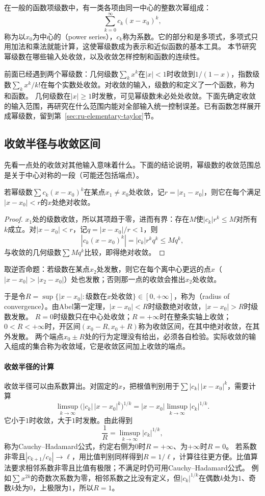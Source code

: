 在一般的函数项级数中，有一类各项由同一中心的整数次幂组成：
\[
 \sum_{k=0}^\infty c_k(x-x_0)^k,
\]
称为以$x_0$为中心的（power series），$c_k$称为系数。它的部分和是多项式，多项式只用加法和乘法就能计算，这使幂级数成为表示和近似函数的基本工具。
本节研究幂级数在哪些输入处收敛，以及收敛怎样控制和函数的连续性。

前面已经遇到两个幂级数：几何级数$\sum_kx^k$在$|x|<1$时收敛到$1/(1-x)$，指数级数$\sum_kx^k/k!$在每个实数处收敛。对收敛的输入，级数的和定义了一个函数，称为和函数。
几何级数在$|x|\geq1$时发散，可见幂级数未必处处收敛。下面先确定收敛的输入范围，再研究在什么范围内能对全部输入统一控制误差。已有函数怎样展开成幂级数，留到第~\ref{sec:ru-elementary-taylor}节。

\subsection{收敛半径与收敛区间}
\label{sec:ru-radius-of-convergence}

先看一点处的收敛对其他输入意味着什么。下面的结论说明，幂级数的收敛范围总是关于中心对称的一段（可能还包括端点）。
\begin{theorem}[Abel第一定理]
\label{thm:ru-abel-lemma}
若幂级数$\sum c_k(x-x_0)^k$在某点$x_1\neq x_0$处收敛，记$r=|x_1-x_0|$，则它在每个满足$|x-x_0|<r$的$x$处绝对收敛。
\end{theorem}
\begin{proof}
$x_1$处的级数收敛，所以其项趋于零，进而有界：存在$M$使$|c_k|r^k\leq M$对所有$k$成立。对$|x-x_0|<r$，记$q=|x-x_0|/r<1$，则
\[
 |c_k(x-x_0)^k|=|c_k|r^kq^k\leq Mq^k,
\]
与收敛的几何级数$\sum Mq^k$比较，即得绝对收敛。
\end{proof}
取逆否命题：若级数在某点$x_2$处发散，则它在每个离中心更远的点$x$（$|x-x_0|>|x_2-x_0|$）处也发散；否则那一点的收敛会推出$x_2$处收敛。

于是令$R=\sup\{|x-x_0|:\text{级数在}x\text{处收敛}\}\in[0,+\infty]$，称为（radius of convergence）。由Abel第一定理，$|x-x_0|<R$时级数绝对收敛，$|x-x_0|>R$时级数发散。
$R=0$时级数只在中心处收敛；$R=+\infty$时在整条实轴上收敛；$0<R<+\infty$时，开区间$(x_0-R,x_0+R)$称为收敛区间，在其中绝对收敛，在其外发散。
两个端点$x_0\pm R$处的行为定理没有给出，必须各自检验。实际收敛的输入组成的集合称为收敛域，它是收敛区间加上收敛的端点。

\paragraph{收敛半径的计算}
收敛半径可以由系数算出。对固定的$x$，把根值判别用于$\sum|c_k|\,|x-x_0|^k$，需要计算
\[
 \limsup_{k\to\infty}\bigl(|c_k|\,|x-x_0|^k\bigr)^{1/k}=|x-x_0|\limsup_{k\to\infty}|c_k|^{1/k}.
\]
它小于$1$时收敛，大于$1$时发散。由此得到
\begin{equation}
 \frac1R=\limsup_{k\to\infty}|c_k|^{1/k},
 \label{eq:ru-cauchy-hadamard}
\end{equation}
称为Cauchy--Hadamard公式，约定右侧为$0$时$R=+\infty$、为$+\infty$时$R=0$。
若系数非零且$|c_{k+1}/c_k|\to\ell$，用比值判别同样得到$R=1/\ell$，计算往往更方便。比值算法要求相邻系数非零且比值有极限；不满足时仍可用Cauchy--Hadamard公式。
例如$\sum x^{2k}$的奇数次系数为零，相邻系数之比没有定义，但$|c_k|^{1/k}$在偶数$k$处为$1$、奇数$k$处为$0$，上极限为$1$，所以$R=1$。

